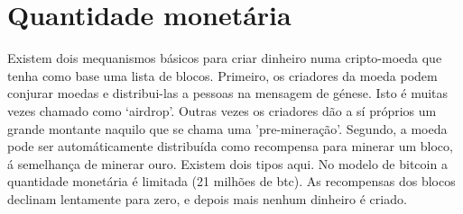 \section{Quantidade monetária}
\label{sec:money-supply}

Existem dois mequanismos básicos para criar dinheiro numa cripto-moeda que tenha como base uma lista de blocos.
Primeiro, os criadores da moeda podem conjurar moedas e distribui-las a pessoas na mensagem de génese. Isto é muitas vezes chamado como `airdrop'. Outras vezes os criadores dão a sí próprios um grande montante naquilo que se chama uma 'pre-mineração'. \cite{premine-description}
Segundo, a moeda pode ser automáticamente distribuída como recompensa para minerar um bloco, á semelhança de minerar ouro. Existem dois tipos aqui. No modelo de bitcoin a quantidade monetária é limitada (21 milhões de btc). As recompensas dos blocos declinam lentamente para zero, e depois mais nenhum dinheiro é criado. 

